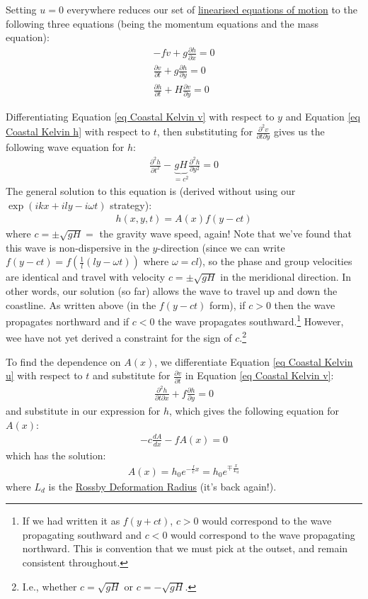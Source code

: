 Setting \(u=0\) everywhere reduces our set of \hyperref[L SW Eqn]{linearised equations of motion} to the following three equations (being the momentum equations and the mass equation):
\begin{align}
    \label{eq Coastal Kelvin u}
    -fv+g\frac{\partial h}{\partial x}=0
    \\
    \label{eq Coastal Kelvin v}
    \frac{\partial v}{\partial t}+g\frac{\partial h}{\partial y}=0
    \\
    \label{eq Coastal Kelvin h}
    \frac{\partial h}{\partial t}+H\frac{\partial v}{\partial y}=0
\end{align}

Differentiating Equation \ref{eq Coastal Kelvin v} with respect to \(y\) and Equation \ref{eq Coastal Kelvin h} with respect to \(t\), then substituting for \(\frac{\partial^2 v}{\partial t \partial y}\) gives us the following wave equation for \(h\):
\begin{align*}
    \frac{\partial^2 h}{\partial t^2}-\underbrace{gH}_{=c^2}\frac{\partial^2 h}{\partial y^2}=0
\end{align*}
The general solution to this equation is (derived without using our \(\exp\left( ikx+ily - i\omega t \right)\) strategy):
\begin{align*}
    h(x,y,t)=A(x)f(y-ct)
\end{align*}
where \(c=\pm\sqrt{gH}=\) the gravity wave speed, again! Note that we've found that this wave is non-dispersive in the \(y\)-direction (since we can write \(f(y-ct)=f(\frac{1}{l}(ly-\omega t))\) where \(\omega = cl\)), so the phase and group velocities are identical and travel with velocity \(c=\pm\sqrt{gH}\) in the meridional direction. In other words, our solution (so far) allows the wave to travel up and down the coastline. As written above (in the \(f(y-ct)\) form), if \(c>0\) then the wave propagates northward and if \(c<0\) the wave propagates southward.\footnote{
    If we had written it as \(f(y+ct)\), \(c>0\) would correspond to the wave propagating southward and \(c<0\) would correspond to the wave propagating northward. This is convention that we must pick at the outset, and remain consistent throughout.}
However, wee have not yet derived a constraint for the sign of \(c\).\footnote{I.e., whether \(c=\sqrt{gH}\) or \(c=-\sqrt{gH}\).} 

To find the dependence on \(A(x)\), we differentiate Equation \ref{eq Coastal Kelvin u} with respect to \(t\) and substitute for \(\frac{\partial v}{\partial t}\) in Equation \ref{eq Coastal Kelvin v}:
\begin{align*}
    \frac{\partial^2 h}{\partial t \partial x}+f \frac{\partial h}{\partial y}=0
\end{align*}
and substitute in our expression for \(h\), which gives the following equation for \(A(x)\):
\begin{align*}
    -c \frac{dA}{dx}-fA(x)=0
\end{align*}
which has the solution:
\begin{align*}
    A(x)=h_0 e^{-\frac{f}{c}x}=h_0 e^{\mp \frac{x}{L_d}}
\end{align*}
where \(L_d\) is the \hyperref[SW Def Radius Box]{Rossby Deformation Radius} (it's back again!).

